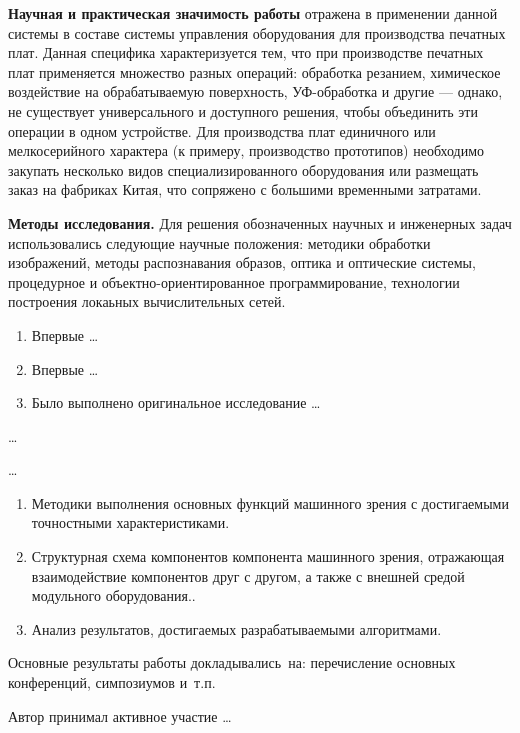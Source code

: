\textbf{Научная и практическая значимость работы} отражена в применении данной системы в составе системы управления оборудования для производства печатных плат. Данная специфика характеризуется тем, что при производстве печатных плат применяется множество разных операций: обработка резанием, химическое воздействие на обрабатываемую поверхность, УФ-обработка и другие — однако, не существует универсального и доступного решения, чтобы объединить эти операции в одном устройстве. Для производства плат единичного или мелкосерийного характера (к примеру, производство прототипов) необходимо закупать несколько видов специализированного оборудования или размещать заказ на фабриках Китая, что сопряжено с большими временными затратами.

\textbf{Методы исследования.} Для решения обозначенных научных и инженерных задач использовались следующие научные положения: методики обработки изображений, методы распознавания образов, оптика и оптические системы, процедурное и объектно-ориентированное программирование, технологии построения локаьных вычислительных сетей.

{\novelty}
\begin{enumerate}[beginpenalty=10000] %
  \item Впервые \ldots
  \item Впервые \ldots
  \item Было выполнено оригинальное исследование \ldots
\end{enumerate}

{\influence} \ldots

{\methods} \ldots

{}
\begin{enumerate}[beginpenalty=10000] %
 \item Методики выполнения основных функций машинного зрения с достигаемыми точностными характеристиками.
 \item Структурная схема компонентов компонента машинного зрения, отражающая взаимодействие компонентов друг с другом, а также с внешней средой модульного оборудования..
 \item Анализ результатов, достигаемых разрабатываемыми алгоритмами.
\end{enumerate}

{\probation}
Основные результаты работы докладывались~на:
перечисление основных конференций, симпозиумов и~т.\:п.

{\contribution} Автор принимал активное участие \ldots

